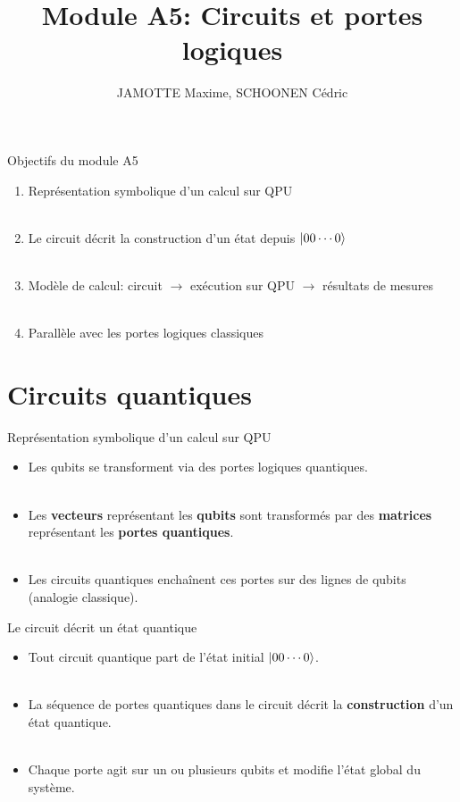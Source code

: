 \documentclass[aspectratio=169,12pt]{beamer}
\title[Module A5]{Module A5: Circuits et portes logiques}
\author{JAMOTTE Maxime, SCHOONEN Cédric}
\institute{Digital Learning Hub}
\date{}
\begin{document}
\begin{frame}
  \titlepage
\end{frame}

\begin{frame}{Objectifs du module A5}
  \begin{enumerate}
    \item Représentation symbolique d'un calcul sur QPU\\~\\
    \item Le circuit décrit la construction d'un état depuis $\ket{00\cdots0}$\\~\\
    \item Modèle de calcul: circuit $\rightarrow$ exécution sur QPU $\rightarrow$ résultats de mesures\\~\\
    \item Parallèle avec les portes logiques classiques
  \end{enumerate}
\end{frame}

\section{Circuits quantiques}

\begin{frame}{Représentation symbolique d'un calcul sur QPU}
  \begin{itemize}[<+->]
    \setlength{\itemsep}{0.55em}
    \item Les qubits se transforment via des portes logiques quantiques.\\~\\
    \item Les \textbf{vecteurs} représentant les \textbf{qubits} sont transformés par des \textbf{matrices}
     représentant les \textbf{portes quantiques}.\\~\\
    \item Les circuits quantiques enchaînent ces portes sur des lignes de qubits (analogie classique).
  \end{itemize}
\end{frame}

\begin{frame}{Le circuit décrit un état quantique}
  \begin{itemize}[<+->]
    \setlength{\itemsep}{0.55em}
    \item Tout circuit quantique part de l'état initial $\ket{00\cdots0}$.\\~\\
    \item La séquence de portes quantiques dans le circuit décrit la \textbf{construction} d'un état quantique.\\~\\
    \item Chaque porte agit sur un ou plusieurs qubits et modifie l'état global du système.
  \end{itemize}
\end{frame}
\end{document}
